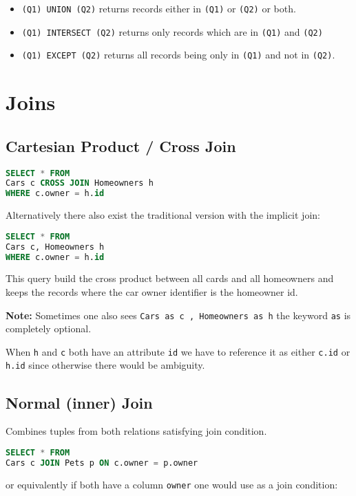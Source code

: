 \documentclass{article}
\renewcommand{\t}[1]{\texttt{#1}}
\begin{document}
\begin{itemize}
	\item \t{(Q1) UNION (Q2)} returns records either in \t{(Q1)} or \t{(Q2)} or both.
	\item \t{(Q1) INTERSECT (Q2)} returns only records which are in \t{(Q1)} and \t{(Q2)}
	\item \t{(Q1) EXCEPT (Q2)} returns all records being only in \t{(Q1)} and not in \t{(Q2)}.
\end{itemize}

\section*{Joins}

\subsection*{Cartesian Product / Cross Join}

\begin{lstlisting}[language=SQL]
SELECT * FROM 
Cars c CROSS JOIN Homeowners h
WHERE c.owner = h.id
\end{lstlisting}

Alternatively there also exist the traditional version with the implicit join:

\begin{lstlisting}[language=SQL]
SELECT * FROM 
Cars c, Homeowners h
WHERE c.owner = h.id
\end{lstlisting}

This query build the cross product between all cards and all homeowners and keeps the records where the car owner identifier is the homeowner id.

\textbf{Note:} Sometimes one also sees \t{Cars as c , Homeowners as h} the keyword \t{as} is completely optional.


When \t{h} and \t{c} both have an attribute \t{id} we have to reference it as either \t{c.id} or \t{h.id} since otherwise there would be ambiguity.

\subsection*{Normal (inner) Join}
Combines tuples from both relations satisfying join condition.
\begin{lstlisting}[language=SQL]
SELECT * FROM 
Cars c JOIN Pets p ON c.owner = p.owner
\end{lstlisting}

or equivalently if both have a column \t{owner} one would use as a join condition:
\end{document}
